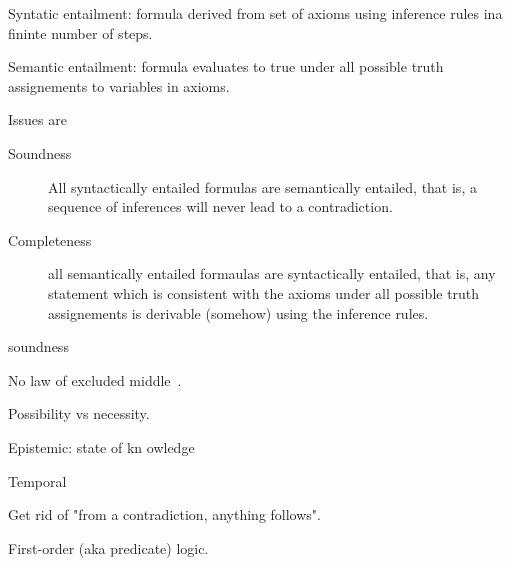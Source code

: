 Syntatic entailment: formula derived from set of axioms 
using inference rules ina fininte number of steps.

Semantic entailment: formula evaluates to \textsf{true}
under all possible truth assignements to variables
in axioms.

Issues are 
\begin{description}
\item[Soundness]
All syntactically entailed formulas
are semantically entailed, that is,
a sequence of inferences will never lead to a contradiction.

\item[Completeness] 
all semantically entailed formaulas 
are syntactically entailed, that is,
any statement which is consistent with the axioms under all 
possible truth assignements is derivable (somehow) using the 
inference rules.
\end{description}soundness 

\label{sec:Intuitionist_zeroth_order_logic}

\cite{wiki:Intuitionistic_logic}

No law of excluded middle~\cite{wiki:Law_of_excluded_middle}.

\label{sec:Modal_logic}

\cite{wiki:Modal_logic}

Possibility vs necessity.

Epistemic: state of kn owledge

Temporal 

\label{sec:Paraconsistent_logic}

\cite{wiki:Paraconsistent_logic}

Get rid of "from a contradiction, anything follows".
\label{sec:First_order_logic}

First-order (aka predicate) logic.~\cite{wiki:First_order_logic,
sep:logic_firstorder_emergence}

